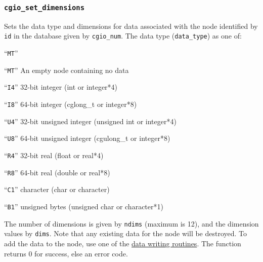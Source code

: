 \subsubsection{\texttt{cgio\_set\_dimensions}} \label{set_dimensions}
    \noindent
    Sets the data type and dimensions for data associated with the node
    identified by \texttt{id} in the database given by \texttt{cgio\_num}.
    The data type (\texttt{data\_type}) as one of:
    \begin{Ventryi}{``\texttt{MT}''}
    \item [``\texttt{MT}'']
          An empty node containing no data
    \item [``\texttt{I4}'']
          32-bit integer (int or integer*4)
    \item [``\texttt{I8}'']
          64-bit integer (cglong\_t or integer*8)
    \item [``\texttt{U4}'']
          32-bit unsigned integer (unsigned int or integer*4)
    \item [``\texttt{U8}'']
          64-bit unsigned integer (cgulong\_t or integer*8)
    \item [``\texttt{R4}'']
          32-bit real (float or real*4)
    \item [``\texttt{R8}'']
          64-bit real (double or real*8)
    \item [``\texttt{C1}'']
          character (char or character)
    \item [``\texttt{B1}'']
          unsigned bytes (unsigned char or character*1)
    \end{Ventryi}
    \noindent
    The number of dimensions is given by \texttt{ndims} (maximum is 12), and
    the dimension values by \texttt{dims}. Note that any existing data for the
    node will be destroyed. To add the data to the node, use one of the
    \hyperlink{s:dataio}{data writing routines}. The function returns 0 for
    success, else an error code.

